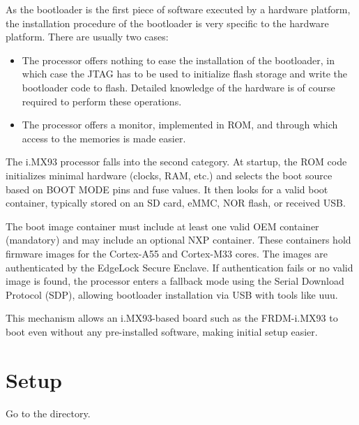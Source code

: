 
As the bootloader is the first piece of software executed by a
hardware platform, the installation procedure of the bootloader is
very specific to the hardware platform. There are usually two cases:

\begin{itemize}

\item The processor offers nothing to ease the installation of the
  bootloader, in which case the JTAG has to be used to initialize
  flash storage and write the bootloader code to flash. Detailed
  knowledge of the hardware is of course required to perform these
  operations.

\item The processor offers a monitor, implemented in ROM, and through
  which access to the memories is made easier.

\end{itemize}

The i.MX93 processor falls into the second category. At startup, the
ROM code initializes minimal hardware (clocks, RAM, etc.) and selects
the boot source based on BOOT MODE pins and fuse values. It then looks
for a valid boot container, typically stored on an SD card, eMMC, NOR
flash, or received USB.

The boot image container must include at least one valid OEM container
(mandatory) and may include an optional NXP container. These
containers hold firmware images for the Cortex-A55 and Cortex-M33
cores. The images are authenticated by the EdgeLock Secure Enclave. If
authentication fails or no valid image is found, the processor enters
a fallback mode using the Serial Download Protocol (SDP), allowing
bootloader installation via USB with tools like uuu.

This mechanism allows an i.MX93-based board such as the FRDM-i.MX93 to boot
even without any pre-installed software, making initial setup easier.

\section{Setup}

Go to the  directory.

